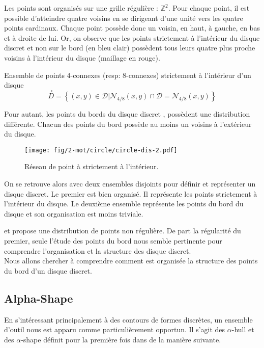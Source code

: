Les points sont organisés sur une grille régulière : $\mathbb{Z}^{2}$. Pour chaque point, il est possible d'atteindre quatre voisins en se dirigeant d'une unité vers les quatre points cardinaux. Chaque point possède donc un voisin, en haut, à gauche, en bas et à droite de lui. Or, on observe que les points strictement à l'intérieur du disque discret et non sur le bord (en bleu clair) possèdent tous leurs quatre plus proche voisins à l'intérieur du disque (maillage en rouge).

\begin{Definition}{Ensemble de points 4-connexes (resp: 8-connexes) strictement à l'intérieur d'un disque}
\label{def:int-ens}
  $$ \stackrel{\ \circ}{D} =  \left\{ (x,y) \in \mathcal{D} | \mathcal{N}_{4/8}(x,y) \cap \mathcal{D} = \mathcal{N}_{4/8}(x,y) \right\}$$
\end{Definition}

Pour autant, les points du bords du disque discret , possèdent une distribution différente. Chacun des points du bord possède au moins un voisins à l'extérieur du disque.

\begin{figure}[H]
  \centering
  \texttt{[image: fig/2-mot/circle/circle-dis-2.pdf]}
  \caption{Réseau de point à strictement à l'intérieur.}
\end{figure}

On se retrouve alors avec deux ensembles disjoints pour définir et représenter un disque discret. Le premier est bien organisé. Il représente les points strictement à l'intérieur du disque. Le deuxième ensemble représente les points du bord du disque et son organisation est moins triviale.

et propose une distribution de points non régulière. De part la régularité du premier, seule l'étude des points du bord nous semble pertinente pour comprendre l'organisation et la structure des disque discret.\\

Nous allons chercher à comprendre comment est organisée la structure des points du bord d'un disque discret.


\subsection{Alpha-Shape}

En s'intéressant principalement à des contours de formes discrètes, un ensemble d'outil nous est apparu comme particulièrement opportun. Il s'agit des $\alpha$-hull et des $\alpha$-shape définit pour la première fois dans \cite{EdeKirSei83} de la manière suivante.

